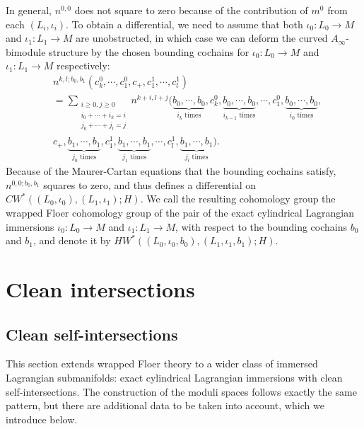 \documentclass{amsart}
\numberwithin{equation}{section}
\numberwithin{figure}{section}
\begin{document}
	In general, $n^{0, 0}$ does not square to zero because of the contribution of $m^{0}$ from each $(L_{i}, \iota_{i})$. To obtain a differential, we need to assume that both $\iota_{0}: L_{0} \to M$ and $\iota_{1}: L_{1} \to M$ are unobstructed, in which case we can deform the curved $A_{\infty}$-bimodule structure by the chosen bounding cochains for $\iota_{0}: L_{0} \to M$ and $\iota_{1}: L_{1} \to M$ respectively:
\begin{equation}
\begin{split}
&n^{k, l; b_{0}, b_{1}}(c^{0}_{k}, \cdots, c^{0}_{1}, c_{+}, c^{1}_{1}, \cdots, c^{1}_{l})\\
&= \sum_{\substack{i \ge 0, j \ge 0\\ i_{0} + \cdots + i_{k} = i\\ j_{0} + \cdots + j_{l} = j}} n^{k+i, l+j}(\underbrace{b_{0}, \cdots, b_{0}}_{\text{$i_{k}$ times}}, c^{0}_{k}, \underbrace{b_{0}, \cdots, b_{0}}_{\text{$i_{k-1}$ times}}, \cdots, c^{0}_{1}, \underbrace{b_{0}, \cdots, b_{0}}_{\text{$i_{0}$ times}},\\
&c_{+}, \underbrace{b_{1}, \cdots, b_{1}}_{\text{$j_{0}$ times}}, c^{1}_{1}, \underbrace{b_{1}, \cdots, b_{1}}_{\text{$j_{1}$ times}}, \cdots, c^{1}_{l}, \underbrace{b_{1}, \cdots, b_{1}}_{\text{$j_{l}$ times}}).
\end{split}
\end{equation}
Because of the Maurer-Cartan equations that the bounding cochains satisfy, $n^{0, 0; b_{0}, b_{1}}$ squares to zero, and thus defines a differential on $CW^{*}((L_{0}, \iota_{0}), (L_{1}, \iota_{1}); H)$. We call the resulting cohomology group the wrapped Floer cohomology group of the pair of the exact cylindrical Lagrangian immersions $\iota_{0}: L_{0} \to M$ and $\iota_{1}: L_{1} \to M$, with respect to the bounding cochains $b_{0}$ and $b_{1}$, and denote it by $HW^{*}((L_{0}, \iota_{0}, b_{0}), (L_{1}, \iota_{1}, b_{1}); H)$. \par

\section{Clean intersections}\label{section: immersed wrapped Floer theory in the case of clean intersections}

\subsection{Clean self-intersections}

	This section extends wrapped Floer theory to a wider class of immersed Lagrangian submanifolds: exact cylindrical Lagrangian immersions with clean self-intersections. The construction of the moduli spaces follows exactly the same pattern, but there are additional data to be taken into account, which we introduce below. \par
\end{document}
